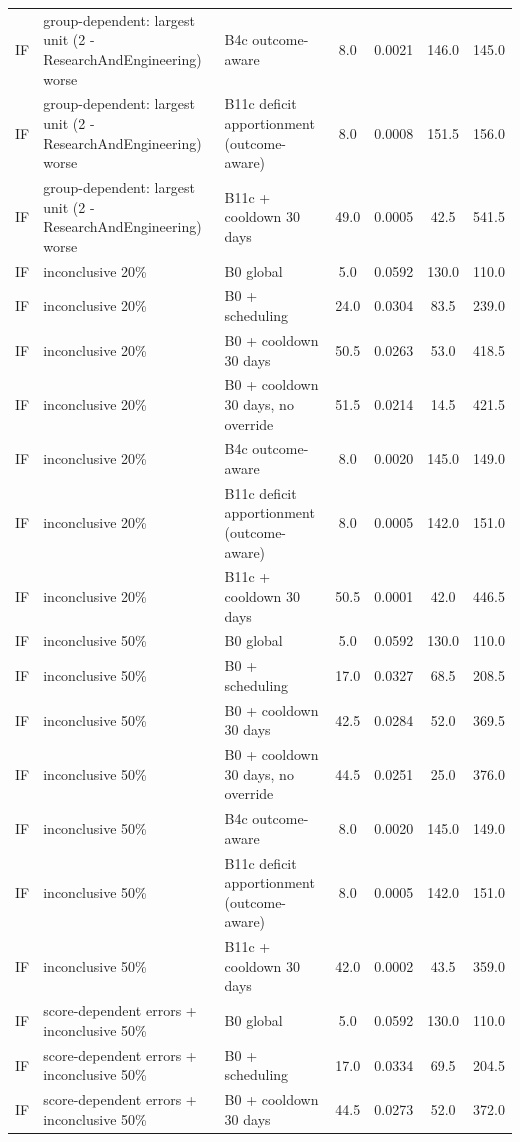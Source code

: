 \begin{longtable}{lp{5.2cm}p{4.4cm}cccc}
IF & group-dependent: largest unit (2 - ResearchAndEngineering) worse & B4c outcome-aware & 8.0 & 0.0021 & 146.0 & 145.0 \\
IF & group-dependent: largest unit (2 - ResearchAndEngineering) worse & B11c deficit apportionment (outcome-aware) & 8.0 & 0.0008 & 151.5 & 156.0 \\
IF & group-dependent: largest unit (2 - ResearchAndEngineering) worse & B11c + cooldown 30 days & 49.0 & 0.0005 & 42.5 & 541.5 \\
IF & inconclusive 20\% & B0 global & 5.0 & 0.0592 & 130.0 & 110.0 \\
IF & inconclusive 20\% & B0 + scheduling & 24.0 & 0.0304 & 83.5 & 239.0 \\
IF & inconclusive 20\% & B0 + cooldown 30 days & 50.5 & 0.0263 & 53.0 & 418.5 \\
IF & inconclusive 20\% & B0 + cooldown 30 days, no override & 51.5 & 0.0214 & 14.5 & 421.5 \\
IF & inconclusive 20\% & B4c outcome-aware & 8.0 & 0.0020 & 145.0 & 149.0 \\
IF & inconclusive 20\% & B11c deficit apportionment (outcome-aware) & 8.0 & 0.0005 & 142.0 & 151.0 \\
IF & inconclusive 20\% & B11c + cooldown 30 days & 50.5 & 0.0001 & 42.0 & 446.5 \\
IF & inconclusive 50\% & B0 global & 5.0 & 0.0592 & 130.0 & 110.0 \\
IF & inconclusive 50\% & B0 + scheduling & 17.0 & 0.0327 & 68.5 & 208.5 \\
IF & inconclusive 50\% & B0 + cooldown 30 days & 42.5 & 0.0284 & 52.0 & 369.5 \\
IF & inconclusive 50\% & B0 + cooldown 30 days, no override & 44.5 & 0.0251 & 25.0 & 376.0 \\
IF & inconclusive 50\% & B4c outcome-aware & 8.0 & 0.0020 & 145.0 & 149.0 \\
IF & inconclusive 50\% & B11c deficit apportionment (outcome-aware) & 8.0 & 0.0005 & 142.0 & 151.0 \\
IF & inconclusive 50\% & B11c + cooldown 30 days & 42.0 & 0.0002 & 43.5 & 359.0 \\
IF & score-dependent errors + inconclusive 50\% & B0 global & 5.0 & 0.0592 & 130.0 & 110.0 \\
IF & score-dependent errors + inconclusive 50\% & B0 + scheduling & 17.0 & 0.0334 & 69.5 & 204.5 \\
IF & score-dependent errors + inconclusive 50\% & B0 + cooldown 30 days & 44.5 & 0.0273 & 52.0 & 372.0 \\

\end{longtable}
